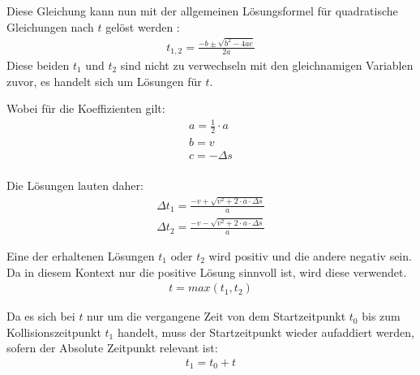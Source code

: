 Diese Gleichung kann nun mit der allgemeinen Lösungsformel für quadratische Gleichungen nach $t$ gelöst werden \cite{wiki.mitternachtsformel:1}:
\begin{align}
    t_{1,2} = \frac{-b \pm \sqrt{b^2 - 4ac}}{2a}
\end{align}
Diese beiden $t_1$ und $t_2$ sind nicht zu verwechseln mit den gleichnamigen Variablen zuvor, es handelt sich um Lösungen für $t$.

Wobei für die Koeffizienten gilt:
\begin{align}
    a = \frac{1}{2} \cdot a\\
    b = v\\
    c = - \Delta s\\
\end{align}

Die Lösungen lauten daher:
\begin{align}
    \Delta t_1 = \frac{-v + \sqrt{v^2 + 2 \cdot a \cdot \Delta s}}{a}\\
    \Delta t_2 = \frac{-v - \sqrt{v^2 + 2 \cdot a \cdot \Delta s}}{a}
\end{align}

Eine der erhaltenen Lösungen $t_1$ oder $t_2$ wird positiv und die andere negativ sein.
Da in diesem Kontext nur die positive Lösung sinnvoll ist, wird diese verwendet.
\begin{align}
    t = max(t_1, t_2)
\end{align}

Da es sich bei $t$ nur um die vergangene Zeit von dem Startzeitpunkt $t_0$ bis zum Kollisionszeitpunkt $t_1$ handelt,
muss der Startzeitpunkt wieder aufaddiert werden, sofern der Absolute Zeitpunkt relevant ist:
\begin{align}
    t_1 = t_0 + t
\end{align}
